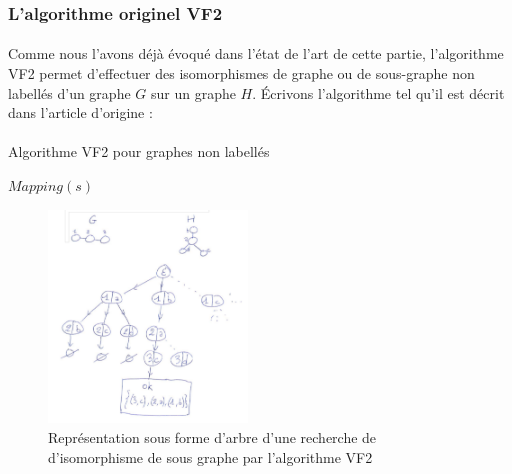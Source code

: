 \documentclass[12pt,french,twoside]{report}
\begin{document}
\subsubsection{L'algorithme originel VF2}

\paragraph{}Comme nous l'avons déjà évoqué dans l'état de l'art de cette partie, l'algorithme VF2 permet d'effectuer des
isomorphismes de graphe ou de sous-graphe non labellés d'un graphe $G$ sur un graphe $H$.
Écrivons l'algorithme tel qu'il est décrit dans l'article d'origine :

\paragraph{}
  \begin{algorithm}[H]
    \caption{Algorithme VF2 pour graphes non labellés}
    
     {
      \KwRet $Mapping(s)$\;
    } 
  \end{algorithm}

\begin{figure}
  \includegraphics[width=200px]{Figures/s2m/recherche/VF2.pdf}
  \caption{\label{vf2}Représentation sous forme d'arbre d'une recherche de d'isomorphisme de sous graphe par l'algorithme VF2}
\end{figure}
\end{document}
